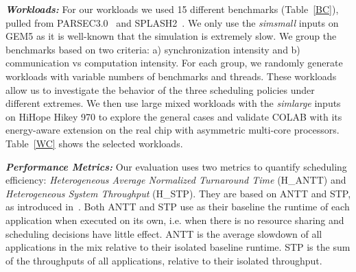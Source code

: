 \textbf{\textit{Workloads:}} For our workloads we used 15 different benchmarks (Table~\ref{BC}), pulled from PARSEC3.0~\cite{bienia11benchmarking} and SPLASH2~\cite{woo1995splash}.
We only use the \emph{simsmall} inputs on GEM5 as it is well-known that the simulation is extremely slow. We group the benchmarks based on two criteria: a) synchronization intensity and b) communication vs computation intensity.
For each group, we randomly generate workloads with variable numbers of benchmarks and threads. These workloads allow us to investigate the behavior of the three scheduling policies under different extremes.
We then use large mixed workloads with the \emph{simlarge} inputs on  HiHope  Hikey  970 to explore the general  cases and validate COLAB with its energy-aware extension on the real chip with asymmetric multi-core processors.
Table~\ref{WC} shows the selected workloads. 



\textbf{\textit{Performance Metrics:}} Our evaluation uses two metrics to quantify scheduling efficiency: {\it Heterogeneous Average Normalized Turnaround Time} (H\_ANTT) and {\it Heterogeneous System Throughput} (H\_STP). They are based on ANTT and STP, as introduced in~\cite{eyerman2008system}. Both ANTT and STP use as their baseline the runtime of each application when executed on its own, i.e. when there is no resource sharing and scheduling decisions have little effect. ANTT is the average slowdown of all applications in the mix relative to their isolated baseline runtime. STP is the sum of the throughputs of all applications, relative to their isolated throughput.

